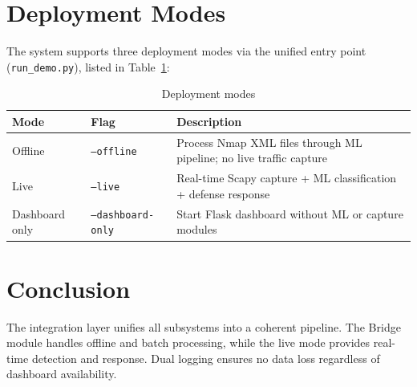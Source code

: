 \section{Deployment Modes}

The system supports three deployment modes via the unified entry point (\texttt{run\_demo.py}), listed in Table~\ref{tab:deploy_modes}:

\begin{table}[H]
\centering
\caption{Deployment modes}
\label{tab:deploy_modes}
\begin{tabular}{llp{6cm}}
\toprule
\textbf{Mode} & \textbf{Flag} & \textbf{Description} \\
\midrule
Offline & \texttt{--offline} & Process Nmap XML files through ML pipeline; no live traffic capture \\
Live & \texttt{--live} & Real-time Scapy capture + ML classification + defense response \\
Dashboard only & \texttt{--dashboard-only} & Start Flask dashboard without ML or capture modules \\
\bottomrule
\end{tabular}
\end{table}

\section{Conclusion}

The integration layer unifies all subsystems into a coherent pipeline. The Bridge module handles offline and batch processing, while the live mode provides real-time detection and response. Dual logging ensures no data loss regardless of dashboard availability.
